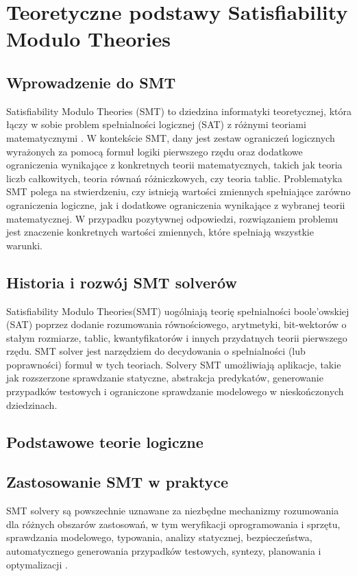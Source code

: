 \chapter{Teoretyczne podstawy Satisfiability Modulo Theories}

\section{Wprowadzenie do SMT}
	Satisfiability Modulo Theories (SMT) to dziedzina informatyki teoretycznej, która łączy w sobie problem spełnialności logicznej (SAT) z różnymi teoriami matematycznymi \cite{MouraB11}. 
	W kontekście SMT, dany jest zestaw ograniczeń logicznych wyrażonych za pomocą formuł logiki pierwszego rzędu oraz dodatkowe ograniczenia wynikające z konkretnych teorii matematycznych, takich jak teoria liczb całkowitych, teoria równań różniczkowych, czy teoria tablic.
	Problematyka SMT polega na stwierdzeniu, czy istnieją wartości zmiennych spełniające zarówno ograniczenia logiczne, jak i dodatkowe ograniczenia wynikające z wybranej teorii matematycznej. W przypadku pozytywnej odpowiedzi, rozwiązaniem problemu jest znaczenie konkretnych wartości zmiennych, które spełniają wszystkie warunki.
	
\section{Historia i rozwój SMT solverów}
Satisfiability Modulo Theories(SMT) uogólniają teorię spełnialności boole'owskiej (SAT) poprzez dodanie rozumowania równościowego, arytmetyki, bit-wektorów o stałym rozmiarze, tablic, kwantyfikatorów i innych przydatnych teorii pierwszego rzędu.
SMT solver jest narzędziem do decydowania o spełnialności (lub poprawności) formuł w tych teoriach. 
Solvery SMT umożliwiają aplikacje, takie jak rozszerzone sprawdzanie statyczne, abstrakcja predykatów, generowanie przypadków testowych i ograniczone sprawdzanie modelowego w nieskończonych dziedzinach.

\section{Podstawowe teorie logiczne}

\section{Zastosowanie SMT w praktyce}
SMT solvery są powszechnie uznawane za niezbędne mechanizmy rozumowania dla różnych obszarów zastosowań, w tym weryfikacji oprogramowania i sprzętu, sprawdzania modelowego, typowania, analizy statycznej, bezpieczeństwa, automatycznego generowania przypadków testowych, syntezy, planowania i optymalizacji \cite{BarbosaBBKLMMMN22}. 


